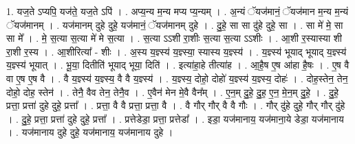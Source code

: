 \documentclass[17pt]{extarticle}
\begin{document}
1. यज॒ते ऽप्यपि॒ यज॑ते॒ यज॒ते ऽपि॑ । . अप्य॒न्य म॒न्य मप्य प्य॒न्यम् । . अ॒न्यं ॅयज॑मानं॒ ॅयज॑मान म॒न्य म॒न्यं ॅयज॑मानम् । . यज॑मानम् दुहे दुहे॒ यज॑मानं॒ ॅयज॑मानम् दुहे । . दु॒हे॒ सा सा दु॑हे दुहे॒ सा । . सा मे॑ मे॒ सा सा मे᳚ । . मे॒ स॒त्या स॒त्या मे॑ मे स॒त्या । . स॒त्या ऽऽशी रा॒शीः स॒त्या स॒त्या ऽऽशीः । . आ॒शी र॒स्यास्या शी रा॒शी र॒स्य । . आ॒शीरित्या᳚ - शीः । . अ॒स्य य॒ज्ञ्स्य॑ य॒ज्ञ्स्या॒ स्यास्य य॒ज्ञ्स्य॑ । . य॒ज्ञ्स्य॑ भूयाद् भूयाद् य॒ज्ञ्स्य॑ य॒ज्ञ्स्य॑ भूयात् । . भू॒या॒ दितीति॑ भूयाद् भूया॒ दिति॑ । . इत्या॑हा॒हे तीत्या॑ह । . आ॒है॒ष ए॒ष आ॑हा है॒षः । . ए॒ष वै वा ए॒ष ए॒ष वै । . वै य॒ज्ञ्स्य॑ य॒ज्ञ्स्य॒ वै वै य॒ज्ञ्स्य॑ । . य॒ज्ञ्स्य॒ दोहो॒ दोहो॑ य॒ज्ञ्स्य॑ य॒ज्ञ्स्य॒ दोहः॑ । . दोह॒स्तेन॒ तेन॒ दोहो॒ दोह॒ स्तेन॑ । . तेनै॒ वैव तेन॒ तेनै॒व । . ए॒वैन॑ मेन मे॒वै वैन᳚म् । . ए॒न॒म् दु॒हे॒ दु॒ह॒ ए॒न॒ मे॒न॒म् दु॒हे॒ । . दु॒हे॒ प्रत्ता॒ प्रत्ता॑ दुहे दुहे॒ प्रत्ता᳚ । . प्रत्ता॒ वै वै प्रत्ता॒ प्रत्ता॒ वै । . वै गौर् गौर् वै वै गौः । . गौर् दु॑हे दुहे॒ गौर् गौर् दु॑हे । . दु॒हे॒ प्रत्ता॒ प्रत्ता॑ दुहे दुहे॒ प्रत्ता᳚ । . प्रत्तेडेडा॒ प्रत्ता॒ प्रत्तेडा᳚ । . इडा॒ यज॑मानाय॒ यज॑माना॒ये डेडा॒ यज॑मानाय । . यज॑मानाय दुहे दुहे॒ यज॑मानाय॒ यज॑मानाय दुहे । \newline
\end{document}
